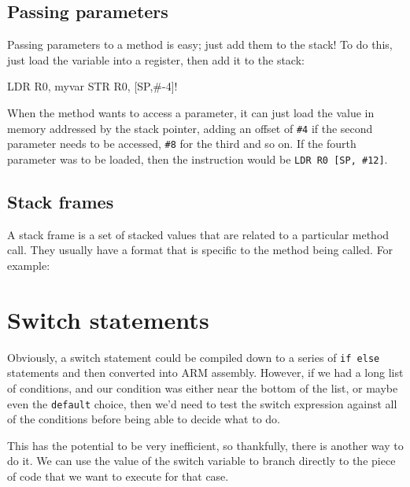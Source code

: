 \subsection{Passing parameters}

Passing parameters to a method is easy; just add them to the stack! To do this,
just load the variable into a register, then add it to the stack:

\begin{listing}{1}
	LDR 	R0, myvar
	STR 	R0, [SP,#-4]!
\end{listing}

When the method wants to access a parameter, it can just load the value in
memory addressed by the stack pointer, adding an offset of {\tt \#4} if the
second parameter needs to be accessed, {\tt \#8} for the third and so on. If the
fourth parameter was to be loaded, then the instruction would be {\tt LDR R0
[SP, \#12]}.

\subsection{Stack frames}

A stack frame is a set of stacked values that are related to a particular method
call. They usually have a format that is specific to the method being called.
For example:

\begin{center}
\begin{drawstack}
		
\end{drawstack}
\end{center}

\section{Switch statements}
\label{sec:switch}
Obviously, a switch statement could be compiled down to a series of {\tt if
else} statements and then converted into ARM assembly. However, if we had a long
list of conditions, and our condition was either near the bottom of the list, or
maybe even the {\tt default} choice, then we'd need to test the switch
expression against all of the conditions before being able to decide what to do.

This has the potential to be very inefficient, so thankfully, there is another
way to do it. We can use the value of the switch variable to branch directly to
the piece of code that we want to execute for that case.

